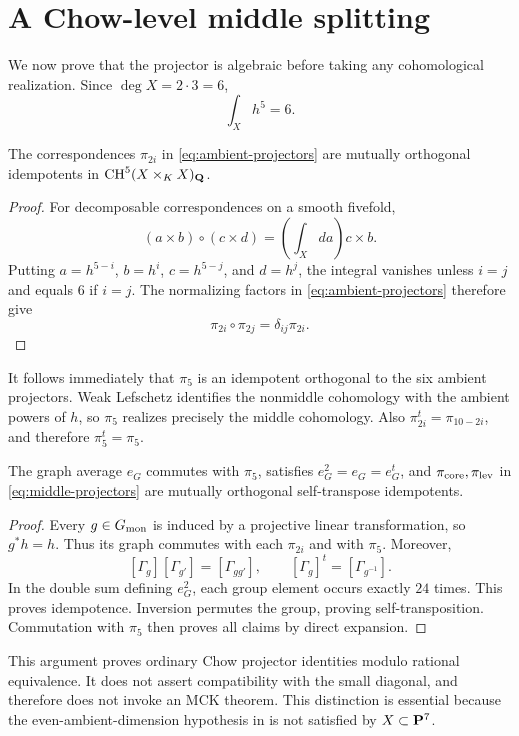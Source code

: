 \section{A Chow-level middle splitting}

We now prove that the projector is algebraic before taking any
cohomological realization.  Since \(\deg X=2\cdot3=6\),
\[
 \int_Xh^5=6.                                      \tag{4.1}
\]

\begin{lemma}
\label{lem:ambient-idempotents}
The correspondences \(\pi_{2i}\) in
\eqref{eq:ambient-projectors} are mutually orthogonal idempotents in
\(\operatorname{CH}^5(X\times_KX)_{\mathbf Q}\).
\end{lemma}

\begin{proof}
For decomposable correspondences on a smooth fivefold,
\[
 (a\times b)\circ(c\times d)
 =\left(\int_Xda\right)c\times b.                  \tag{4.2}
\]
Putting \(a=h^{5-i}\), \(b=h^i\), \(c=h^{5-j}\), and \(d=h^j\),
the integral vanishes unless \(i=j\) and equals \(6\) if \(i=j\).
The normalizing factors in \eqref{eq:ambient-projectors} therefore give
\[
 \pi_{2i}\circ\pi_{2j}=\delta_{ij}\pi_{2i}.
\]
\end{proof}

It follows immediately that \(\pi_5\) is an idempotent orthogonal to
the six ambient projectors.  Weak Lefschetz identifies the nonmiddle
cohomology with the ambient powers of \(h\), so \(\pi_5\) realizes
precisely the middle cohomology.  Also
\(\pi_{2i}^t=\pi_{10-2i}\), and therefore \(\pi_5^t=\pi_5\).

\begin{lemma}
\label{lem:reynolds}
The graph average \(e_G\) commutes with \(\pi_5\), satisfies
\(e_G^2=e_G=e_G^t\), and \(\pi_{\mathrm{core}},\pi_{\mathrm{lev}}\) in
\eqref{eq:middle-projectors} are mutually orthogonal self-transpose
idempotents.
\end{lemma}

\begin{proof}
Every \(g\in G_{\mathrm{mon}}\) is induced by a projective linear transformation, so
\(g^*h=h\).  Thus its graph commutes with each \(\pi_{2i}\) and with
\(\pi_5\).  Moreover,
\[
 [\Gamma_g][\Gamma_{g'}]=[\Gamma_{gg'}],
 \qquad
 [\Gamma_g]^t=[\Gamma_{g^{-1}}].                  \tag{4.3}
\]
In the double sum defining \(e_G^2\), each group element occurs exactly
\(24\) times.  This proves idempotence.  Inversion permutes the group,
proving self-transposition.  Commutation with \(\pi_5\) then proves all
claims by direct expansion.
\end{proof}

\begin{remark}
This argument proves ordinary Chow projector identities modulo rational
equivalence.  It does not assert compatibility with the small diagonal,
and therefore does not invoke an MCK theorem.  This distinction is
essential because the even-ambient-dimension hypothesis in
\cite[Theorem~4.1]{Laterveer2021} is not satisfied by
\(X\subset\mathbf P^7\).
\end{remark}
